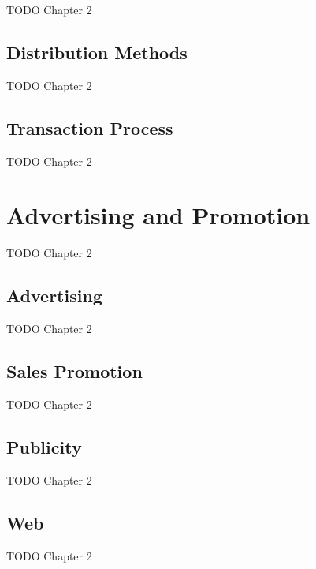 TODO Chapter 2

\subsection{Distribution Methods}

TODO Chapter 2

\subsection{Transaction Process}

TODO Chapter 2


\section{Advertising and Promotion}

TODO Chapter 2

\subsection{Advertising}

TODO Chapter 2

\subsection{Sales Promotion}

TODO Chapter 2

\subsection{Publicity}

TODO Chapter 2

\subsection{Web}

TODO Chapter 2
